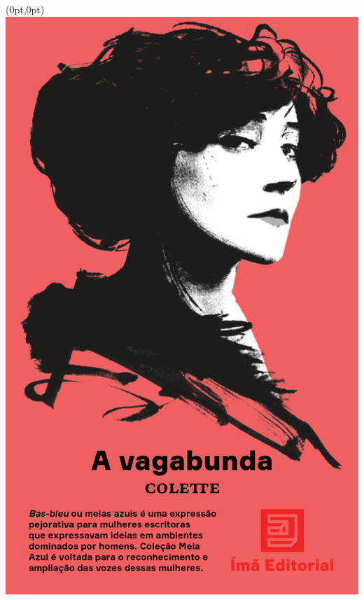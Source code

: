 \pagestyle{ima}
\label{ima}

\begin{textblock*}{5.625in}(0pt,0pt)%
\vspace*{-2.5cm}
\hspace*{-1.95cm}\includegraphics*[width=147mm]{./imgs/IMA.png}
\end{textblock*}

\pagebreak

\hspace{.5cm}

